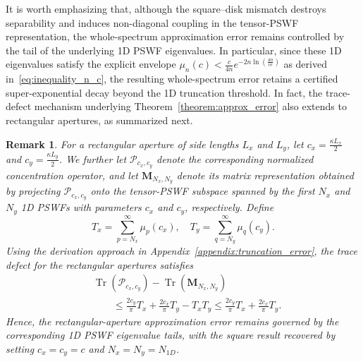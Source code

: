 \documentclass[lettersize,journal]{IEEEtran}
\theoremstyle{plain}
\newtheorem{remark}{Remark}
\begin{document}
It is worth emphasizing that, although the square--disk mismatch destroys separability and induces non-diagonal coupling in the tensor-PSWF representation, the whole-spectrum approximation error remains controlled by the tail of the underlying 1D PSWF eigenvalues. In particular, since these 1D eigenvalues satisfy the explicit envelope $\mu_n(c)
< \frac{c}{4n}
e^{-2n\ln\left(\frac{4n}{ce}\right)}$ as derived in~\eqref{eq:inequality_n_c}, the resulting whole-spectrum error retains a certified super-exponential decay beyond the 1D truncation threshold. 
In fact, the trace-defect mechanism underlying Theorem~\ref{theorem:approx_error} also extends to rectangular apertures, as summarized next.
\begin{remark}
	For a rectangular aperture of side lengths $L_x$ and $L_y$, let $c_x = \frac{\kappa L_x}{2}$ and $c_y = \frac{\kappa L_y}{2}$. We further let $\mathcal{P}_{c_x, c_y}$ denote the corresponding normalized concentration operator, and let $\mathbf{M}_{N_x, N_y}$ denote its matrix representation obtained by projecting $\mathcal{P}_{c_x, c_y}$ onto the tensor-PSWF subspace spanned by the first $N_x$ and $N_y$ 1D PSWFs with parameters $c_x$ and $c_y$, respectively. Define
	$$ T_x = \sum_{p=N_x}^{\infty}\mu_p(c_x),\quad T_y = \sum_{q=N_y}^{\infty}\mu_q(c_y).$$
	Using the derivation approach in Appendix~\ref{appendix:truncation_error}, the trace defect for the rectangular apertures satisfies
	\begin{align}
		&\operatorname{Tr}(\mathcal{P}_{c_x, c_y}) - \operatorname{Tr}(\mathbf{M}_{N_x, N_y}) \nonumber \\ & \qquad \leq \frac{2c_y}{\pi}T_x + \frac{2c_x}{\pi}T_y - T_xT_y \leq \frac{2c_y}{\pi}T_x + \frac{2c_x}{\pi}T_y. \nonumber
	\end{align}
	Hence, the rectangular-aperture approximation error remains governed by the corresponding 1D PSWF eigenvalue tails, with the square result recovered by setting $c_x = c_y = c$ and $N_x = N_y = N_{1D}$.
\end{remark}
\end{document}
